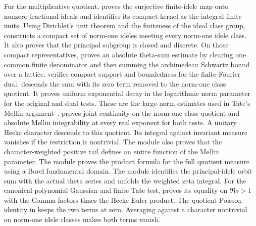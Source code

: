 \documentclass[11pt]{amsart}
\theoremstyle{definition}
\theoremstyle{remark}
\numberwithin{equation}{section}
\begin{document}
For the multiplicative quotient,
 proves the
surjective finite-idele map onto nonzero fractional ideals and
identifies its compact kernel as the integral finite units.
Using Dirichlet's unit theorem and the finiteness of the ideal
class group, 
constructs a compact set of norm-one ideles meeting every
norm-one idele class. It also proves that the principal
subgroup is closed and discrete. On those compact representatives,
 proves an absolute
theta-sum estimate by clearing one common finite denominator and
then summing the archimedean Schwartz bound over a lattice.
 verifies compact support
and boundedness for the finite Fourier dual.
 descends the sum with
its zero term removed to the norm-one class quotient. It proves
uniform exponential decay in the logarithmic norm parameter for
the original and dual tests. These are the large-norm estimates
used in Tate's Mellin argument~\cite{Tate1967}.
 proves joint continuity on
the norm-one class quotient and absolute Mellin integrability at
every real exponent for both tests. A unitary Hecke character
descends to this quotient. Its integral against invariant measure
vanishes if the restriction is nontrivial. The module also proves
that the character-weighted positive tail defines an entire function
of the Mellin parameter. The module
 proves the product formula
for the full quotient measure using a Borel fundamental domain.
The module  identifies the
principal-idele orbit sum with the actual theta series and unfolds
the weighted zeta integral. For the canonical polynomial Gaussian and
finite Tate test,  proves its equality
on \(\Re s>1\) with the Gamma factors times the Hecke Euler product.
The quotient Poisson identity in 
keeps the two terms at zero. Averaging against a character nontrivial
on norm-one idele classes makes both terms vanish.
\end{document}
